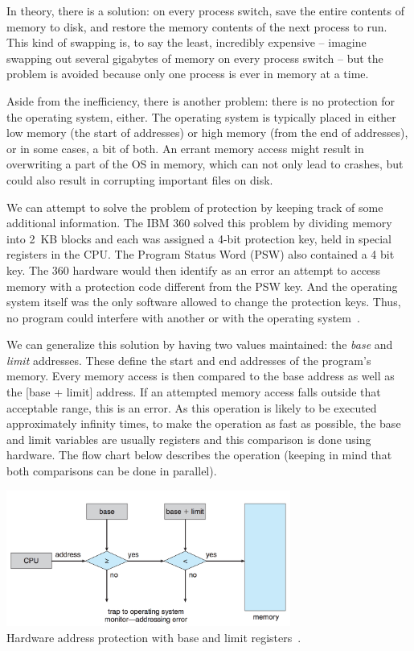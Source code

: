In theory, there is a solution: on every process switch, save the entire contents of memory to disk, and restore the memory contents of the next process to run. This kind of swapping is, to say the least, incredibly expensive -- imagine swapping out several gigabytes of memory on every process switch -- but the problem is avoided because only one process is ever in memory at a time.

Aside from the inefficiency, there is another problem: there is no protection for the operating system, either. The operating system is typically placed in either low memory (the start of addresses) or high memory (from the end of addresses), or in some cases, a bit of both. An errant memory access might result in overwriting a part of the OS in memory, which can not only lead to crashes, but could also result in corrupting important files on disk.

We can attempt to solve the problem of protection by keeping track of some additional information. The IBM 360 solved this problem by dividing memory into 2~KB blocks and each was assigned a 4-bit protection key, held in special registers in the CPU. The Program Status Word (PSW) also contained a 4 bit key. The 360 hardware would then identify as an error an attempt to access memory with a protection code different from the PSW key. And the operating system itself was the only software allowed to change the protection keys. Thus, no program could interfere with another or with the operating system~\cite{mos}.

We can generalize this solution by having two values maintained: the \textit{base} and \textit{limit} addresses. These define the start and end addresses of the program's memory. Every memory access is then compared to the base address as well as the [base + limit] address. If an attempted memory access falls outside that acceptable range, this is an error. As this operation is likely to be executed approximately infinity times, to make the operation as fast as possible, the base and limit variables are usually registers and this comparison is done using hardware. The flow chart below describes the operation (keeping in mind that both comparisons can be done in parallel).

\begin{center}
\includegraphics[width=0.7\textwidth]{images/memory-baselimit.png}\\
Hardware address protection with base and limit registers~\cite{osc}.
\end{center}


